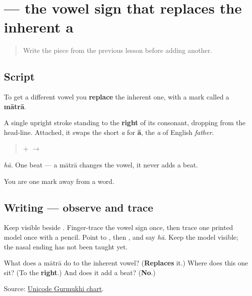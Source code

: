 \section[\texorpdfstring{\pa{ਾ} (-ā)}{ਾ (-ā)}]{ — the vowel sign that replaces the inherent a}

\label{lesson:PA-W01-aa-matra}



\begin{quote}
Write the piece from the previous lesson before adding another.
\end{quote}

\subsection*{Script}
To get a different vowel you \textbf{replace} the inherent one, with a mark called a \textbf{mātrā}.

\begin{quote}
\end{quote}

A single upright stroke standing to the \textbf{right} of its consonant, dropping from the head-line. Attached, it swaps the short \emph{a} for \textbf{ā}, the \emph{a} of English \emph{father}.

\begin{quote}
\textbf{} + \textbf{} $\to$ \textbf{}
\end{quote}

\emph{hā.} One beat — a mātrā changes the vowel, it never adds a beat.

You are one mark away from a word.

\subsection*{Writing — observe and trace}
Keep \textbf{} visible beside \textbf{}. Finger-trace the vowel sign once, then trace one printed model once with a pencil. Point to \textbf{}, then \textbf{}, and say \emph{hā}. Keep the model visible; the nasal ending has not been taught yet.

\begin{tcolorbox}[breakable,colback=teal!4,colframe=teal!35!black,title={Before you move on}]
What does a mātrā do to the inherent vowel? (\textbf{Replaces} it.) Where does this one sit? (To the \textbf{right}.) And does it add a beat? (\textbf{No}.)

Source: \href{https://www.unicode.org/charts/PDF/U0A00.pdf}{Unicode Gurmukhi chart}.
\end{tcolorbox}
